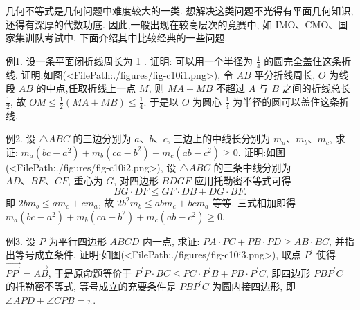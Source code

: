 
几何不等式是几何问题中难度较大的一类.
想解决这类问题不光得有平面几何知识,还得有深厚的代数功底.
因此,一般出现在较高层次的竞赛中, 如 IMO、CMO、国家集训队考试中.
下面介绍其中比较经典的一些问题.



例1. 设一条平面闭折线周长为 1 . 证明: 可以用一个半径为 $\frac{1}{4}$ 的圆完全盖住这条折线.
证明:如图(<FilePath:./figures/fig-c10i1.png>), 令 $A B$ 平分折线周长, $O$ 为线段 $A B$ 的中点,任取折线上一点 $M$, 则 $M A+M B$ 不超过 $A$ 与 $B$ 之间的折线总长 $\frac{1}{2}$, 故 $O M \leqslant \frac{1}{2}(M A+M B) \leqslant \frac{1}{4}$.
于是以 $O$ 为圆心 $\frac{1}{4}$ 为半径的圆可以盖住这条折线.



例2. 设 $\triangle A B C$ 的三边分别为 $a 、 b 、 c$, 三边上的中线长分别为 $m_a 、 m_b 、 m_c$, 求证: $m_a\left(b c-a^2\right)+ m_b\left(c a-b^2\right)+m_c\left(a b-c^2\right) \geqslant 0$.
证明:如图(<FilePath:./figures/fig-c10i2.png>), 设 $\triangle A B C$ 的三条中线分别为 $A D 、 B E 、 C F$, 重心为 $G$, 对四边形 $B D G F$ 应用托勒密不等式可得
$$
B G \cdot D F \leqslant G F \cdot D B+D G \cdot B F .
$$
即 $2 b m_b \leqslant a m_c+c m_a$, 故 $2 b^2 m_b \leqslant a b m_c+b c m_a$ 等等.
三式相加即得 $m_a\left(b c-a^2\right)+m_b\left(c a-b^2\right)+m_c\left(a b-c^2\right) \geqslant 0$.



例3. 设 $P$ 为平行四边形 $A B C D$ 内一点, 求证: $P A \cdot P C+P B \cdot P D \geqslant A B \cdot B C$, 并指出等号成立条件.
证明:如图(<FilePath:./figures/fig-c10i3.png>), 取点 $P^{\prime}$ 使得 $\overrightarrow{P P^{\prime}}=\overrightarrow{A B}$,
于是原命题等价于 $P^{\prime} P \cdot B C \leqslant P C \cdot P^{\prime} B+P B \cdot P^{\prime} C$, 即四边形 $P B P^{\prime} C$ 的托勒密不等式, 等号成立的充要条件是 $P B P^{\prime} C$ 为圆内接四边形, 即 $\angle A P D+\angle C P B=\pi$.



